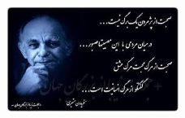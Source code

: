 \documentclass{article}
\begin{document}
	\begin{figure}[h]
		\centering
		\includegraphics[width=0.5\textwidth]{image}
	\end{figure}
\end{document}
